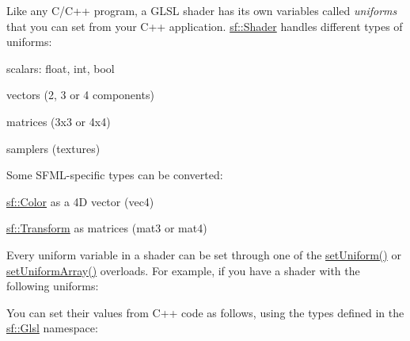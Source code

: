 Like any C/\+C++ program, a G\+L\+SL shader has its own variables called {\itshape uniforms} that you can set from your C++ application. \mbox{\hyperlink{classsf_1_1_shader}{sf\+::\+Shader}} handles different types of uniforms\+: \begin{DoxyItemize}
\item scalars\+: {\ttfamily float}, {\ttfamily int}, {\ttfamily bool} \item vectors (2, 3 or 4 components) \item matrices (3x3 or 4x4) \item samplers (textures)\end{DoxyItemize}
Some S\+F\+M\+L-\/specific types can be converted\+: \begin{DoxyItemize}
\item \mbox{\hyperlink{classsf_1_1_color}{sf\+::\+Color}} as a 4D vector ({\ttfamily vec4}) \item \mbox{\hyperlink{classsf_1_1_transform}{sf\+::\+Transform}} as matrices ({\ttfamily mat3} or {\ttfamily mat4})\end{DoxyItemize}
Every uniform variable in a shader can be set through one of the \mbox{\hyperlink{classsf_1_1_shader_abf78e3bea1e9b0bab850b6b0a0de29c7}{set\+Uniform()}} or \mbox{\hyperlink{classsf_1_1_shader_a731d3b9953c50fe7d3fb03340b97deff}{set\+Uniform\+Array()}} overloads. For example, if you have a shader with the following uniforms\+: 
\begin{DoxyCode}{0}
\end{DoxyCode}
 You can set their values from C++ code as follows, using the types defined in the \mbox{\hyperlink{namespacesf_1_1_glsl}{sf\+::\+Glsl}} namespace\+: 
\begin{DoxyCode}{0}
\end{DoxyCode}


